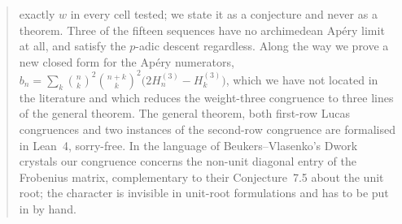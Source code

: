 \documentclass[11pt,reqno]{amsart}
\theoremstyle{plain}
\theoremstyle{definition}
\theoremstyle{remark}
\newcommand{\HH}[2]{H^{(#1)}_{#2}}
\numberwithin{equation}{section}
\begin{document}
\begin{abstract}
exactly $w$ in every cell tested; we state it as a conjecture and never as a theorem.
Three of the fifteen sequences have no archimedean Ap\'ery limit at all, and satisfy the
$p$-adic descent regardless. Along the way we prove a new closed form for the Ap\'ery
numerators,
$b_n=\sum_k\binom nk^2\binom{n+k}k^2\bigl(2\HH{3}{n}-\HH{3}{k}\bigr)$,
which we have not located in the literature and which reduces the weight-three congruence
to three lines of the general theorem. The general theorem, both first-row Lucas
congruences and two instances of the second-row congruence are formalised in Lean~4,
sorry-free. In the language of Beukers--Vlasenko's Dwork crystals our congruence concerns
the non-unit diagonal entry of the Frobenius matrix, complementary to their
Conjecture~7.5 about the unit root; the character is invisible in unit-root formulations
and has to be put in by hand.
\end{abstract}

\maketitle

{\small\tableofcontents}













\end{document}
